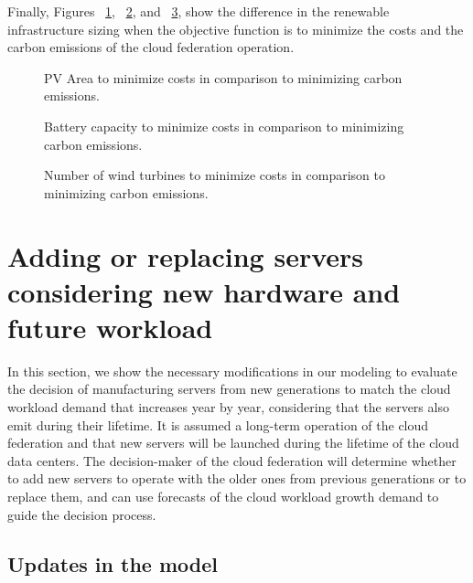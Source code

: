Finally, Figures ~\ref{fig:pv_co2_costs},  ~\ref{fig:bat_co2_costs}, and ~\ref{fig:wt_co2_costs}, show the difference in the renewable infrastructure sizing when the objective function is to minimize the costs and the carbon emissions of the cloud federation operation.

\begin{figure}[H]
  \centering
  {}
  \caption{PV Area to minimize costs in comparison to minimizing carbon emissions. }
  \label{fig:pv_co2_costs}
\end{figure}


\begin{figure}[H]
  \centering
  {}
  \caption{Battery capacity to minimize costs in comparison to minimizing carbon emissions.  }
  \label{fig:bat_co2_costs}
\end{figure}

\begin{figure}[H]
  \centering
  {}
  \caption{Number of wind turbines  to minimize costs in comparison to minimizing carbon emissions.}
  \label{fig:wt_co2_costs}
\end{figure}


\section{Adding or replacing servers considering new hardware and future workload }
\label{sec:new_servers}

In this section, we show the necessary modifications in our modeling to evaluate the decision of manufacturing servers from new generations to match the cloud workload demand that increases year by year, considering that the servers also emit  during their lifetime. It is assumed a long-term operation of the cloud federation and that new servers will be launched during the lifetime of the cloud data centers. The decision-maker of the cloud federation will determine whether to add new servers to operate with the older ones from previous generations or to replace them, and can use forecasts of the cloud workload growth demand to guide the decision process.

\subsection{Updates in the model}


